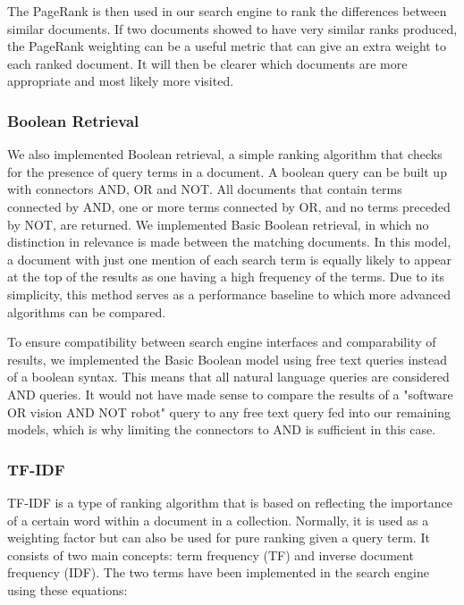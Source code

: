 The PageRank is then used in our search engine to rank the differences between similar documents. If two documents showed to have very similar ranks produced, the PageRank weighting can be a useful metric that can give an extra weight to each ranked document. It will then be clearer which documents are more appropriate and most likely more visited. 



\subsubsection{Boolean Retrieval} %
\label{ssub:boolean_retrieval}

We also implemented Boolean retrieval, a simple ranking algorithm that checks for the presence of query terms in a document. A boolean query can be built up with connectors AND, OR and NOT. All documents that contain terms connected by AND, one or more terms connected by OR, and no terms preceded by NOT, are returned. We implemented Basic Boolean retrieval, in which no distinction in relevance is made between the matching documents. In this model, a document with just one mention of each search term is equally likely to appear at the top of the results as one having a high frequency of the terms. Due to its simplicity, this method serves as a performance baseline to which more advanced algorithms can be compared.

To ensure compatibility between search engine interfaces and comparability of results, we implemented the Basic Boolean model using free text queries instead of a boolean syntax. This means that all natural language queries are considered AND queries. It would not have made sense to compare the results of a "software OR vision AND NOT robot" query to any free text query fed into our remaining models, which is why limiting the connectors to AND is sufficient in this case.

\subsubsection{TF-IDF} %
\label{sub:tf_idf}

TF-IDF is a type of ranking algorithm that is based on reflecting the importance of a certain word within a document in a collection. Normally, it is used as a weighting factor but can also be used for pure ranking given a query term. It consists of two main concepts:  term frequency (TF) and inverse document frequency (IDF). The two terms have been implemented in the search engine using these equations:

